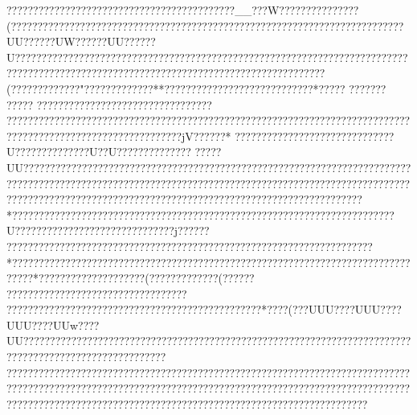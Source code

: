 {{{{{{{{{{{{{{{{{{{{{{{{{{{{{{{{{{{{{{{{{{{{{{{{{{{{{{{{{{{{{{{{{{{{{{{{{{{{{{{{{{{{{{{{{{{{{{{{{{{{{{{{{{{{{{{{{{{{{{{{{{{{{{{{{{{{{{{{{{{{{{{{{{{{{{{{{{{{{{{{{{{{{{{{{{{{{{{{{{{{{{{{{{{{{{{{{{{{{{{{{{{{{{{{{{{{{{{{{{{{{{{{{{{{{{{{{{{{{{{{{{{{{{{{{{{{{{{{{{{{{{{{{{{{{{{{{{{{{{{{{{{{{{{{{{{{{{{{{{{{{{{{{{{{{{{{{{{{{{{{{{{{{{{{{{{{{{{{{{{{{{{{{{{{{{{{{{{{{{{{{{{{{{{{{{{{{{{{{{{{{{{{{{{{{{{{{{{{{{{{{{{{{{{{{{{{{{{{{{{{{{{{{{{{{{{{{{{{{{{{{{{{{{{{{{{{{{{{{{{{{{{{{{{{{{{{{{{{{{{{{{{{{{{{{{{{{{{{{{{{{{{{{{{{{{{{{{{{{{{{{{{{{{{{{{{{{{{{{{{{{{{{{{{{{{{{{{{{{{{{{{{{{{{{{{{{{{{{{{{{{{{{{{{{{{{{{{{{{{{{{{{{{{{{{{{{{{{{{{{{{{{{{{{{{{{{{{{{{{{{{{{{{{{{{{{{{{{{{{{{{{{{{{{{{{{{{{{{{{{{{{{{{{{{{{{{{{{{{{{{{{{{{{{{{{{{{{{{{{{{{{{{{{{{{{{{{{{{{{{{{{{{{{{{{{{{{{{{{{{{{{{{{{{{{{{{{{{{{{{{{{{{{{{{{{{{{{{???????????????????????????????????????????__???W???????????????( ??????????????????????????????????????????????????????????????????????????UU??????UW??????UU??????U???????????????????????????????????????????????????????????????????????????????????????????????   ???????????????????????????????????????(??????? ??????"???????? ?????** ????????????????????????????* ????? ? ??????  ?????  ??????? ?????   ?????   ?????   ?????   ??????  ??????? ??????????????????????????????????????????????????????????????????????????????????????????????????????jV??????*
??????????????????????????????U??????????????U??U?????????????? ?????UU??????????????????????????}??????????????????????????????????????????????????????????????????????????????????????????????????????????????????????????????????????????????????????????????????????????????????????????????*????????????????????????????????????????????????????????????????????????U??????  ?????  ???????????????????j??????????????????????????????????  ?????? ?????????    ??????????????????????????*????????????????????????????????????????????????????????????????????????????????*??????? ??????? ??????( ?????????????( ??????
 ?????? ??????? ??????? ??????????????
 ??????  ??????  ??????  ??????  ?????  ?????   ?????   ?????   ????*   ????(   ???UUU????UUU????UUU????UUw????UU?????   ?????  ??????????????????????????????????????????????    ??????????????????????????????????????????????? ??????????????????????????????????????????????????????????????????????????????????????????????????????????????????????????????????????????????????????????????????????????????????????????????????????????????????????? ?????
}}}}}}}}}}}}}}}}}}}}}}}}}}}}}}}}}}}}}}}}}}}}}}}}}}}}}}}}}}}}}}}}}}}}}}}}}}}}}}}}}}}}}}}}}}}}}}}}}}}}}}}}}}}}}}}}}}}}}}}}}}}}}}}}}}}}}}}}}}}}}}}}}}}}}}}}}}}}}}}}}}}}}}}}}}}}}}}}}}}}}}}}}}}}}}}}}}}}}}}}}}}}}}}}}}}}}}}}}}}}}}}}}}}}}}}}}}}}}}}}}}}}}}}}}}}}}}}}}}}}}}}}}}}}}}}}}}}}}}}}}}}}}}}}}}}}}}}}}}}}}}}}}}}}}}}}}}}}}}}}}}}}}}}}}}}}}}}}}}}}}}}}}}}}}}}}}}}}}}}}}}}}}}}}}}}}}}}}}}}}}}}}}}}}}}}}}}}}}}}}}}}}}}}}}}}}}}}}}}}}}}}}}}}}}}}}}}}}}}}}}}}}}}}}}}}}}}}}}}}}}}}}}}}}}}}}}}}}}}}}}}}}}}}}}}}}}}}}}}}}}}}}}}}}}}}}}}}}}}}}}}}}}}}}}}}}}}}}}}}}}}}}}}}}}}}}}}}}}}}}}}}}}}}}}}}}}}}}}}}}}}}}}}}}}}}}}}}}}}}}}}}}}}}}}}}}}}}}}}}}}}}}}}}}}}}}}}}}}}}}}}}}}}}}}}}}}}}}}}}}}}}}}}}}}}}}}}}}}}}}}}}}}}}}}}}}}}}}}}}}}}}}}}}}}}}}}}}}}}}}}}}}}}}}}}}}}}}}}}}}}}}}}}}}}}}}}}}}}}}}}}}}}}}}}}}}}}}}}}}}}}}}}}}}}}}}}}
